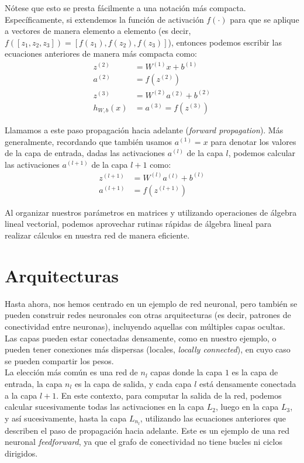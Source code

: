 Nótese que esto se presta fácilmente a una notación más compacta. Específicamente, si extendemos la función de activación $f(\cdot)$ para que se aplique a vectores de manera elemento a elemento (es decir, $f([z_1, z_2, z_3]) = [f(z_1), f(z_2), f(z_3)]$), entonces podemos escribir las ecuaciones anteriores de manera más compacta como:
\begin{align}
z^{(2)} &= W^{(1)} x + b^{(1)} \\
a^{(2)} &= f(z^{(2)}) \\
z^{(3)} &= W^{(2)} a^{(2)} + b^{(2)} \\
h_{W,b}(x) &= a^{(3)} = f(z^{(3)})
\end{align}

Llamamos a este paso propagación hacia adelante (\textit{forward propagation}). Más generalmente, recordando que también usamos $a^{(1)} = x$ para denotar los valores de la capa de entrada, dadas las activaciones $a^{(l)}$ de la capa $l$, podemos calcular las activaciones $a^{(l+1)}$ de la capa $l+1$ como:
\begin{align}
z^{(l+1)} &= W^{(l)} a^{(l)} + b^{(l)} \\
a^{(l+1)} &= f(z^{(l+1)})
\end{align}

Al organizar nuestros parámetros en matrices y utilizando operaciones de álgebra lineal vectorial, podemos aprovechar rutinas rápidas de álgebra lineal para realizar cálculos en nuestra red de manera eficiente. \\

\section{Arquitecturas}

Hasta ahora, nos hemos centrado en un ejemplo de red neuronal, pero también se pueden construir redes neuronales con otras arquitecturas (es decir, patrones de conectividad entre neuronas), incluyendo aquellas con múltiples capas ocultas. Las capas pueden estar conectadas densamente, como en nuestro ejemplo, o pueden tener conexiones más dispersas (locales, \textit{locally connected}), en cuyo caso se pueden compartir los pesos. \\

La elección más común es una red de $n_l$ capas donde la capa $1$ es la capa de entrada, la capa $n_l$ es la capa de salida, y cada capa $l$ está densamente conectada a la capa $l+1$. En este contexto, para computar la salida de la red, podemos calcular sucesivamente todas las activaciones en la capa $L_2$, luego en la capa $L_3$, y así sucesivamente, hasta la capa $L_{n_l}$, utilizando las ecuaciones anteriores que describen el paso de propagación hacia adelante. Este es un ejemplo de una red neuronal \textit{feedforward}, ya que el grafo de conectividad no tiene bucles ni ciclos dirigidos. \\

